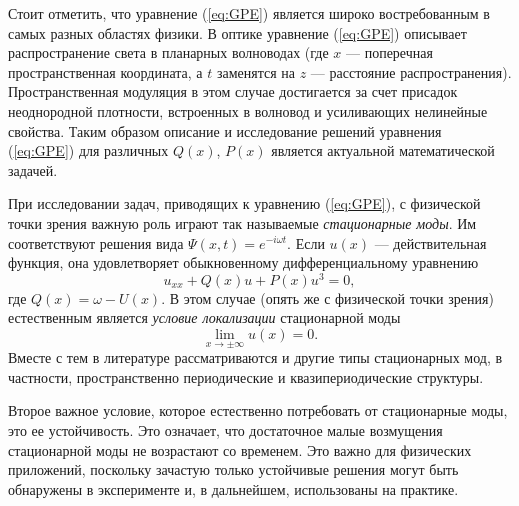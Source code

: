 Стоит отметить, что уравнение (\ref{eq:GPE}) является широко востребованным в самых разных областях физики.
В оптике уравнение (\ref{eq:GPE}) описывает распространение света в планарных волноводах (где $x$ --- поперечная пространственная координата, а $t$ заменятся на $z$ --- расстояние распространения).
Пространственная модуляция в этом случае достигается за счет присадок неоднородной плотности, встроенных в волновод и усиливающих нелинейные свойства.
Таким образом описание и исследование решений уравнения (\ref{eq:GPE}) для различных $Q(x)$, $P(x)$ является актуальной математической задачей.

При исследовании задач, приводящих к уравнению (\ref{eq:GPE}), с физической точки зрения важную роль играют так называемые {\it стационарные моды}.
Им соответствуют решения вида $\Psi(x, t) = e^{-i \omega t}$.
Если $u(x)$ --- действительная функция, она удовлетворяет обыкновенному дифференциальному уравнению
%
\begin{equation}
u_{xx} + Q(x)u + P(x)u^3 = 0,
\label{eq:stationary}
\end{equation}
%
где $Q(x) = \omega - U(x)$.
В этом случае (опять же с физической точки зрения) естественным является {\it условие локализации} стационарной моды
%
\begin{equation}
\lim \limits_{x \to \pm \infty} u(x) = 0.
\label{eq:localization}
\end{equation}
%
Вместе с тем в литературе рассматриваются и другие типы стационарных мод, в частности, пространственно периодические и квазипериодические структуры.

Второе важное условие, которое естественно потребовать от стационарные моды, это ее устойчивость.
Это означает, что достаточное малые возмущения стационарной моды не возрастают со временем.
Это важно для физических приложений, поскольку зачастую только устойчивые решения могут быть обнаружены в эксперименте и, в дальнейшем, использованы на практике.
